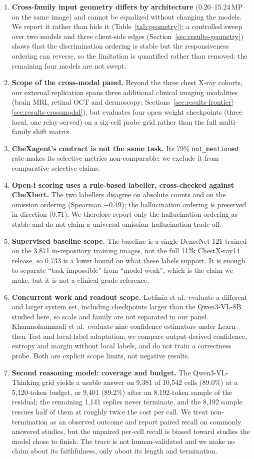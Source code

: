 \begin{enumerate}[leftmargin=1.2em,itemsep=2pt,topsep=2pt]
\item \textbf{Cross-family input geometry differs by architecture} (0.20--15.24\,MP on the same image) and cannot be equalized without changing the models. We report it rather than hide it (Table~\ref{tab:geometry}); a controlled sweep over two models and three client-side edges (Section~\ref{sec:results-geometry}) shows that the discrimination ordering is stable but the responsiveness ordering can reverse, so the limitation is quantified rather than removed: the remaining four models are not swept.
\item \textbf{Scope of the cross-modal panel.} Beyond the three chest X-ray cohorts, our external replication spans three additional clinical imaging modalities (brain MRI, retinal OCT and dermoscopy; Sections~\ref{sec:results-frontier}--\ref{sec:results-crossmodal}), but evaluates four open-weight checkpoints (three local, one relay-served) on a six-cell probe grid rather than the full multi-family shift matrix.
\item \textbf{CheXagent's contract is not the same task.} Its 79\% \texttt{not\_mentioned} rate makes its selective metrics non-comparable; we exclude it from comparative selective claims.
\item \textbf{Open-i scoring uses a rule-based labeller, cross-checked against CheXbert.} The two labellers disagree on absolute counts and on the omission ordering (Spearman $-0.49$); the hallucination ordering is preserved in direction ($0.71$). We therefore report only the hallucination ordering as stable and do not claim a universal omission--hallucination trade-off.
\item \textbf{Supervised baseline scope.} The baseline is a single DenseNet-121 trained on the 3,871 in-repository training images, not the full 112k ChestX-ray14 release, so 0.733 is a lower bound on what these labels support. It is enough to separate ``task impossible'' from ``model weak'', which is the claim we make, but it is not a clinical-grade reference.
\item \textbf{Concurrent work and readout scope.} Lotfinia et al.\ evaluate a different and larger system set, including checkpoints larger than the Qwen3-VL-8B studied here, so scale and family are not separated in our panel. Khanmohammadi et al.\ evaluate nine confidence estimators under Learn-then-Test and local-label adaptation; we compare output-derived confidence, entropy and margin without local labels, and do not train a correctness probe. Both are explicit scope limits, not negative results.
\item \textbf{Second reasoning model: coverage and budget.} The Qwen3-VL-Thinking grid yields a usable answer on 9,381 of 10,542 cells (89.0\%) at a 5,120-token budget, or 9,401 (89.2\%) after an 8,192-token sample of the residual; the remaining 1,141 replies never terminate, and the 8,192 sample rescues half of them at roughly twice the cost per call. We treat non-termination as an observed outcome and report paired recall on commonly answered studies, but the unpaired per-cell recall is biased toward studies the model chose to finish. The trace is not human-validated and we make no claim about its faithfulness, only about its length and termination.

\end{enumerate}
